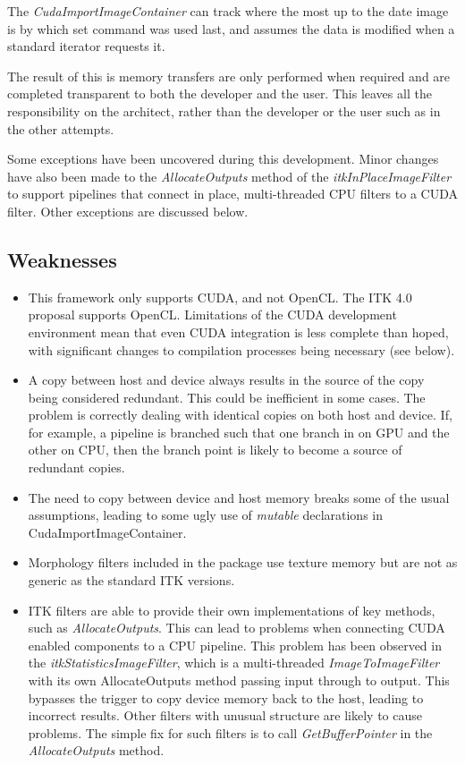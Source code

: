 \documentclass{InsightArticle}
\begin{document}
The {\em CudaImportImageContainer} can track where the most up to the
date image is by which set command was used last, and assumes the data
is modified when a standard iterator requests it.

The result of this is memory transfers are only performed when
required and are completed transparent to both the developer and the
user. This leaves all the responsibility on the architect, rather than
the developer or the user such as in the other attempts.

Some exceptions have been uncovered during this development. Minor
changes have also been made to the {\em AllocateOutputs} method of the
{\em itkInPlaceImageFilter} to support pipelines that connect in
place, multi-threaded CPU filters to a CUDA filter. Other exceptions
are discussed below.
 
\subsection{Weaknesses}
\begin{itemize}
\item This framework only supports CUDA, and not OpenCL. The ITK 4.0
proposal supports OpenCL. Limitations of the CUDA development
environment mean that even CUDA integration is less complete than
hoped, with significant changes to compilation processes being
necessary (see below).
\item A copy between host and device always results in the source of
the copy being considered redundant. This could be inefficient in some
cases. The problem is correctly dealing with identical copies on both
host and device. If, for example, a pipeline is branched such that one
branch in on GPU and the other on CPU, then the branch point is likely
to become a source of redundant copies.
\item The need to copy between device and host memory breaks some of
the usual assumptions, leading to some ugly use of {\em mutable}
declarations in CudaImportImageContainer.
\item Morphology filters included in the package use texture memory
but are not as generic as the standard ITK versions.
\item ITK filters are able to provide their own implementations of key
methods, such as {\em AllocateOutputs}. This can lead to problems when
connecting CUDA enabled components to a CPU pipeline. This problem has
been observed in the {\em itkStatisticsImageFilter}, which is a
multi-threaded {\em ImageToImageFilter} with its own AllocateOutputs
method passing input through to output. This bypasses the trigger to
copy device memory back to the host, leading to incorrect
results. Other filters with unusual structure are likely to cause
problems. The simple fix for such filters is to call {\em
  GetBufferPointer} in the {\em AllocateOutputs} method.
\end{itemize}
\end{document}
